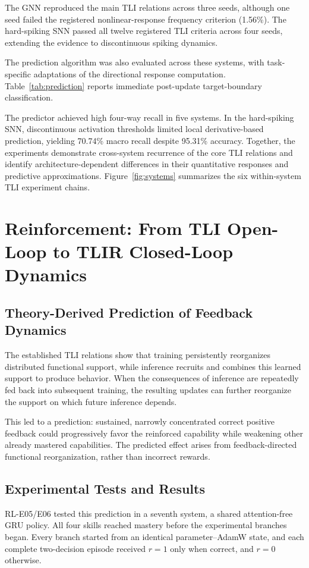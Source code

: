 \documentclass[12pt,letterpaper]{article}
\begin{document}
The GNN reproduced the main TLI relations across three seeds, although one seed failed the registered nonlinear-response frequency criterion (1.56\%). The hard-spiking SNN passed all twelve registered TLI criteria across four seeds, extending the evidence to discontinuous spiking dynamics.



The prediction algorithm was also evaluated across these systems, with task-specific adaptations of the directional response computation. Table~\ref{tab:prediction} reports immediate post-update target-boundary classification.



The predictor achieved high four-way recall in five systems. In the hard-spiking SNN, discontinuous activation thresholds limited local derivative-based prediction, yielding 70.74\% macro recall despite 95.31\% accuracy. Together, the experiments demonstrate cross-system recurrence of the core TLI relations and identify architecture-dependent differences in their quantitative responses and predictive approximations. Figure~\ref{fig:systems} summarizes the six within-system TLI experiment chains.

\section{Reinforcement: From TLI Open-Loop to TLIR Closed-Loop Dynamics}
\label{sec:reinforcement}
\subsection{Theory-Derived Prediction of Feedback Dynamics}
The established TLI relations show that training persistently reorganizes distributed functional support, while inference recruits and combines this learned support to produce behavior. When the consequences of inference are repeatedly fed back into subsequent training, the resulting updates can further reorganize the support on which future inference depends.

This led to a prediction: sustained, narrowly concentrated correct positive feedback could progressively favor the reinforced capability while weakening other already mastered capabilities. The predicted effect arises from feedback-directed functional reorganization, rather than incorrect rewards.

\subsection{Experimental Tests and Results}
RL-E05/E06 tested this prediction in a seventh system, a shared attention-free GRU policy. All four skills reached mastery before the experimental branches began. Every branch started from an identical parameter--AdamW state, and each complete two-decision episode received $r=1$ only when correct, and $r=0$ otherwise.
\end{document}
